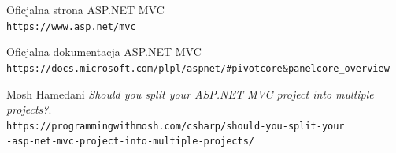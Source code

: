 \documentclass{article}
\begin{document}
\newpage
\begin{thebibliography}{9}

Oficjalna strona ASP.NET MVC
\\\texttt{https://www.asp.net/mvc}

Oficjalna dokumentacja ASP.NET MVC
\\\texttt{https://docs.microsoft.com/pl\-pl/aspnet/\#pivot\=core\&panel\=core\_overview}

Mosh Hamedani
\textit{Should you split your ASP.NET MVC project into multiple projects?}.
\\\texttt{https://programmingwithmosh.com/csharp/should-you-split-your\\-asp-net-mvc-project-into-multiple-projects/}

\end{thebibliography}
\newpage

\listoffigures
\newpage
\end{document}
